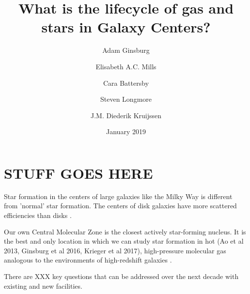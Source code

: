 \documentclass{aastex62}
\begin{document}
\author{Adam Ginsburg}
\author{Elisabeth A.C. Mills}
\author{Cara Battersby}
\author{Steven Longmore}
\author{J.M. Diederik Kruijssen}

\title{What is the lifecycle of gas and stars in Galaxy Centers?}
\date{January 2019}

\section{STUFF GOES HERE}

Star formation in the centers of large galaxies like the Milky Way is different from 'normal' star formation. %
The centers of disk galaxies have more scattered efficiencies than disks \citep{Leroy2013a}. 

Our own Central Molecular Zone is the closest actively star-forming nucleus.
It is the best and only location in which we can study star formation in hot
(Ao et al 2013, Ginsburg et al 2016, Krieger et al 2017), high-pressure
molecular gas analogous to the environments of high-redshift galaxies \citep{Kruijssen2013a}.


There are XXX key questions that can be addressed over the next decade with existing and new facilities.
\end{document}
